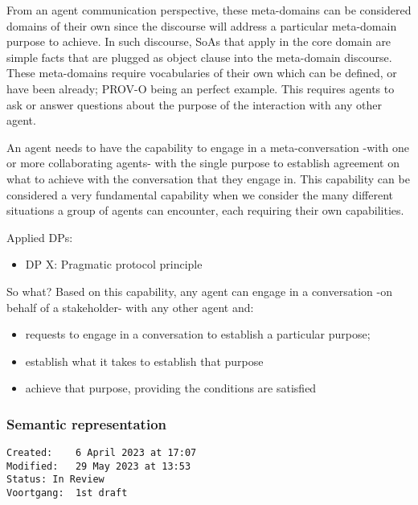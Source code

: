 \documentclass[sort&compress,preprint,3p,authoryear,twocolumn]{elsarticle}
\providecommand{\tightlist}{%
  \setlength{\itemsep}{0pt}\setlength{\parskip}{0pt}}
\theoremstyle{break}			%
\begin{document}
From an agent communication perspective, these meta-domains can be
considered domains of their own since the discourse will address a
particular meta-domain purpose to achieve. In such discourse, SoAs that
apply in the core domain are simple facts that are plugged as object
clause into the meta-domain discourse. These meta-domains require
vocabularies of their own which can be defined, or have been already;
PROV-O being an perfect example. This requires agents to ask or answer
questions about the purpose of the interaction with any other agent.

\begin{mmconcern}\label{cncrn:rmc}
An agent needs to have the capability to engage in a meta-conversation -with one or more collaborating agents- with the single purpose to establish agreement on what to achieve with the conversation that they engage in. This capability can be considered a very fundamental capability when we consider the many different situations a group of agents can encounter, each requiring their own capabilities.
\end{mmconcern}

Applied DPs:

\begin{itemize}
\tightlist
\item
  DP X: Pragmatic protocol principle
\end{itemize}

So what? Based on this capability, any agent can engage in a
conversation -on behalf of a stakeholder- with any other agent and:

\begin{itemize}
\tightlist
\item
  requests to engage in a conversation to establish a particular
  purpose;
\item
  establish what it takes to establish that purpose
\item
  achieve that purpose, providing the conditions are satisfied
\end{itemize}

\subsubsection{Semantic representation}\label{semantic-representation}

\begin{verbatim}
Created:    6 April 2023 at 17:07
Modified:   29 May 2023 at 13:53
Status: In Review
Voortgang:  1st draft
\end{verbatim}
\end{document}
